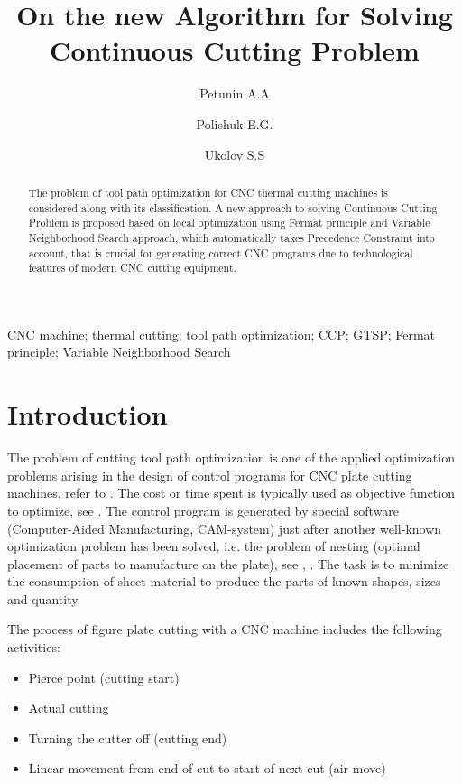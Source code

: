 \documentclass{ifacconf}
\begin{document}
\begin{frontmatter}

\title{On the new Algorithm for Solving Continuous Cutting Problem}

\author[urfu]{Petunin A.A}
\author[urfu]{Polishuk E.G.}
\author[urfu]{Ukolov S.S}

\address[urfu]{Ural Federal University, Yekaterinburg, Russia}

\begin{abstract}                %
The problem of tool path optimization
for CNC thermal cutting machines is considered
along with its classification.
A new approach to solving
Continuous Cutting Problem
is proposed
based on local optimization
using Fermat principle
and Variable Neighborhood Search approach,
which automatically takes
Precedence Constraint into account,
that is crucial for generating
correct CNC programs
due to technological features
of modern CNC cutting equipment.
\end{abstract}

\begin{keyword}
CNC machine; thermal cutting;
tool path optimization;
CCP; GTSP;
Fermat principle;
Variable Neighborhood Search
\end{keyword}

\end{frontmatter}

\section{Introduction}

The problem of cutting tool path optimization
is one of the applied optimization problems arising
in the design of control programs for CNC plate cutting machines,
refer to \cite{Dewil2016Nov}.
The cost or time spent is typically used
as objective function to optimize,
see
\cite{Makarovskikh2018Feb}.
The control program is generated by special software
(Computer-Aided Manufacturing, CAM-system)
just after another well-known optimization problem
has been solved,
i.e. the problem of nesting
(optimal placement of parts to manufacture on the plate),
see \cite{huang2009optimal},
\cite{sherif2014sequential}.
The task is to minimize the consumption of sheet material
to produce the parts of known shapes, sizes and quantity.

The process of figure plate cutting with a CNC machine includes
the following activities:
\begin{itemize}
    \item{Pierce point} (cutting start)
    \item{Actual cutting}
    \item{Turning the cutter off} (cutting end)
    \item{Linear movement from end of cut to start of next cut} (air move)
\end{itemize}
\end{document}
